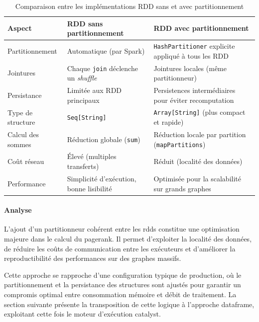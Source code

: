 \documentclass[conference]{IEEEtran}
\renewcommand{\arraystretch}{1.2}
\begin{document}
\begin{table}[H]
\centering
\caption{Comparaison entre les implémentations RDD sans et avec partitionnement}
\label{tab:rdd-vs-rddpart}
\renewcommand{\arraystretch}{1.2}
\begin{tabularx}{\linewidth}{|>{\raggedright\arraybackslash}p{3cm}|X|X|}
\hline
\textbf{Aspect} & \textbf{RDD sans partitionnement} & \textbf{RDD avec partitionnement} \\
\hline
Partitionnement & Automatique (par Spark) & \texttt{HashPartitioner} explicite appliqué à tous les RDD \\
\hline
Jointures & Chaque \texttt{join} déclenche un \textit{shuffle} & Jointures locales (même partitionneur) \\
\hline
Persistance & Limitée aux RDD principaux & Persistences intermédiaires pour éviter recomputation \\
\hline
Type de structure & \texttt{Seq[String]} & \texttt{Array[String]} (plus compact et rapide) \\
\hline
Calcul des sommes & Réduction globale (\texttt{sum}) & Réduction locale par partition (\texttt{mapPartitions}) \\
\hline
Coût réseau & Élevé (multiples transferts) & Réduit (localité des données) \\
\hline
Performance & Simplicité d'exécution, bonne lisibilité & Optimisée pour la scalabilité sur grands graphes \\
\hline
\end{tabularx}
\end{table}

\paragraph{Analyse}

L'ajout d'un \og partitionneur \fg{} cohérent entre les \glspl{rdd} constitue une optimisation majeure dans le calcul du \gls{pagerank}.
Il permet d'exploiter la localité des données, de réduire les coûts de communication entre les exécuteurs et d'améliorer la reproductibilité des performances sur des graphes massifs.  

Cette approche se rapproche d'une configuration typique de production, où le partitionnement et la persistance des structures sont ajustés pour garantir un compromis optimal entre consommation mémoire et débit de traitement.  
La section suivante présente la transposition de cette logique à l'approche \gls{dataframe}, exploitant cette fois le moteur d'exécution \gls{catalyst}.
\end{document}
